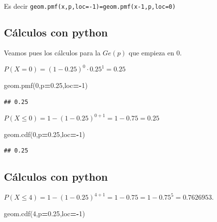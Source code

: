 \documentclass[]{book}
\newenvironment{Shaded}{\begin{snugshade}}{\end{snugshade}}
\newcommand{\DecValTok}[1]{\textcolor[rgb]{0.00,0.00,0.81}{#1}}
\newcommand{\FloatTok}[1]{\textcolor[rgb]{0.00,0.00,0.81}{#1}}
\newcommand{\NormalTok}[1]{#1}
\newcommand{\OperatorTok}[1]{\textcolor[rgb]{0.81,0.36,0.00}{\textbf{#1}}}
\begin{document}
Es decir \texttt{geom.pmf(x,p,loc=-1)=geom.pmf(x-1,p,loc=0)}

\hypertarget{cuxe1lculos-con-python-2}{%
\subsection{Cálculos con python}\label{cuxe1lculos-con-python-2}}

Veamos pues los cálculos para la \(Ge(p)\) que empieza en \(0\).

\(P(X=0)=(1-0.25)^0\cdot 0.25^1=0.25\)

\begin{Shaded}
\begin{Highlighting}[]
\NormalTok{geom.pmf(}\DecValTok{0}\NormalTok{,p}\OperatorTok{=}\FloatTok{0.25}\NormalTok{,loc}\OperatorTok{=-}\DecValTok{1}\NormalTok{)}
\end{Highlighting}
\end{Shaded}

\begin{verbatim}
## 0.25
\end{verbatim}

\(P(X\leq 0)=1- (1-0.25)^{0+1}=1-0.75=0.25\)

\begin{Shaded}
\begin{Highlighting}[]
\NormalTok{geom.cdf(}\DecValTok{0}\NormalTok{,p}\OperatorTok{=}\FloatTok{0.25}\NormalTok{,loc}\OperatorTok{=-}\DecValTok{1}\NormalTok{)}
\end{Highlighting}
\end{Shaded}

\begin{verbatim}
## 0.25
\end{verbatim}

\hypertarget{cuxe1lculos-con-python-3}{%
\subsection{Cálculos con python}\label{cuxe1lculos-con-python-3}}

\(P(X\leq 4)=1-(1-0.25)^{4+1}=1-0.75=1-0.75^5=0.7626953.\)

\begin{Shaded}
\begin{Highlighting}[]
\NormalTok{geom.cdf(}\DecValTok{4}\NormalTok{,p}\OperatorTok{=}\FloatTok{0.25}\NormalTok{,loc}\OperatorTok{=-}\DecValTok{1}\NormalTok{)}
\end{Highlighting}
\end{Shaded}
\end{document}
